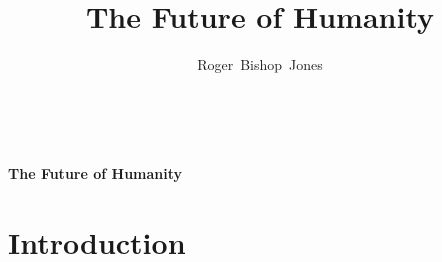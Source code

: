 \documentclass[12pt,titlepage]{article}
\title{The Future of Humanity}
\author{Roger~Bishop~Jones}
\date{\ }
\begin{document}
                               
\begin{titlepage}
\maketitle






\end{titlepage}

\setcounter{tocdepth}{2}
{\parskip-0pt\tableofcontents}



\pagebreak

\begin{centering}
{\LARGE \bf The Future of Humanity}
\end{centering}

\section{Introduction}
\end{document}
